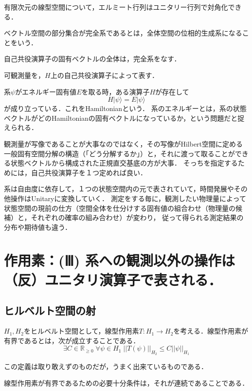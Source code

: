 \documentclass[uplatex, dvipdfmx]{jsreport}
\begin{document}
\begin{proposition}[対角化]
    有限次元の線型空間について，エルミート行列はユニタリー行列で対角化できる．
\end{proposition}
\begin{definition}
    ベクトル空間の部分集合が完全系であるとは，全体空間の位相的生成系になることをいう．
\end{definition}
\begin{corollary}
    自己共役演算子の固有ベクトルの全体は，完全系をなす．
\end{corollary}

\begin{axiom}[observable]
    可観測量を，$H$上の自己共役演算子によって表す．
\end{axiom}
\begin{example}
    系$\psi$がエネルギー固有値$E$を取る時，ある演算子$H$が存在して
    \[ H|\psi\rangle = E|\psi\rangle \]
    が成り立っている．これをHamiltonianという．
    系のエネルギーとは，系の状態ベクトルがどのHamiltonianの固有ベクトルになっているか，という問題だと捉えられる．
\end{example}

\begin{remark}
    観測量が写像であることが大事なのではなく，その写像がHilbert空間に定める一般固有空間分解の構造（「どう分解するか」）と，それに渡って取ることができる状態ベクトルから構成された正規直交基底の方が大事．
    そっちを指定するためには，自己共役演算子を１つ定めれば良い．

    系は自由度に依存して，１つの状態空間内の元で表されていて，時間発展やその他操作はUnitaryに変換していく．
    測定をする毎に，観測したい物理量によって状態空間の現前の仕方（空間全体を仕分けする固有値の組合わせ（物理量の候補）と，それぞれの確率の組み合わせ）が変わり，
    従って得られる測定結果の分布や期待値も違う．
\end{remark}

\section{作用素：(Ⅲ) 系への観測以外の操作は（反）ユニタリ演算子で表される．}
\subsection{ヒルベルト空間の射}

\begin{definition}[有界作用素]
    $H_1,H_2$をヒルベルト空間として，線型作用素$T:H_1\to H_2$を考える．線型作用素が有界であるとは，次が成立することである．
    \[ \exists C\in\mathbb{R}_{\ge 0}\;\forall\psi\in H_1\; ||T(\psi)||_{H_2}\le C||\psi ||_{H_1} \]
\end{definition}
この定義は取り敢えずのものだが，うまく出来ているものである．
\begin{proposition}[連続線型作用素]
    線型作用素が有界であるための必要十分条件は，それが連続であることである．
\end{proposition}
\end{document}
